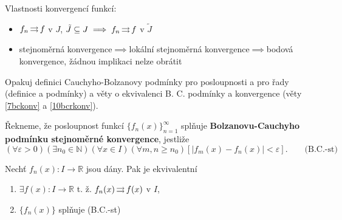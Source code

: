 \begin{poznamka}
    Vlastnosti konvergencí funkcí:
  \begin{itemize}
    \item $f_n \operatorname{\rightrightarrows} f$ v $J$, $\tilde{J} \subseteq J \implies f_n \operatorname{\rightrightarrows} f$ v $\tilde{J}$
    \item stejnoměrná konvergence$\implies$lokální stejnoměrná konvergence$\implies$bodová konvergence, žádnou implikaci nelze obrátit
  \end{itemize}
\end{poznamka}

\begin{poznamka}
  Opakuj definici Cauchyho-Bolzanovy podmínky pro posloupnosti a pro řady (definice  a  podmínky) a věty o ekvivalenci B. C. podmínky a konvergence (věty \ref{7bckonv} a \ref{10bcrkonv}).
\end{poznamka}

\begin{definice}
  Řekneme, že posloupnost funkcí $\{f_n(x)\}_{n=1}^\infty$ splňuje \textbf{Bolzanovu-Cauchyho podmínku stejnoměrné konvergence}, jestliže
  $$(\forall \varepsilon >0)(\exists n_0 \in \mathbb N)(\forall x \in I)(\forall m,n \geq n_0)[|f_m(x)-f_n(x)|<\varepsilon]. \qquad \text{(B.C.-st)}$$
\end{definice}

\begin{veta}\label{16bckonv}
  Nechť $f_n(x)\colon I \to \mathbb R$ jsou dány. Pak je ekvivalentní
  \begin{enumerate}[1.]
    \item $\exists f(x)\colon I \to \mathbb R$ t. ž. $f_n(x) \operatorname{\rightrightarrows} f(x)$ v $I$,
    \item $\{f_n(x)\}$ splňuje (B.C.-st)
  \end{enumerate}
\end{veta}

